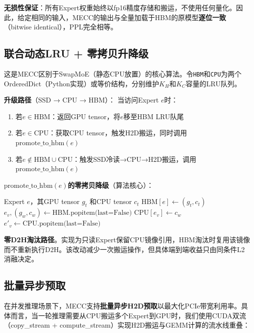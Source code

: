 \documentclass[11pt,a4paper]{article}
\begin{document}
\textbf{无损性保证}：所有Expert权重始终以fp16精度存储和搬运，不使用任何量化。因此，给定相同的输入，MECC的输出与全量加载于HBM的原模型\textbf{逐位一致}（bitwise identical），PPL完全相等。

\subsection{联合动态LRU + 零拷贝升降级}

这是MECC区别于SwapMoE（静态CPU放置）的核心算法。令\texttt{HBM}和\texttt{CPU}为两个OrderedDict（Python实现）或等价结构，分别维护$K_H$和$K_C$容量的LRU队列。

\textbf{升级路径}（SSD → CPU → HBM）：
当访问Expert $e$时：
\begin{enumerate}
    \item 若$e \in \text{HBM}$：返回GPU tensor，将$e$移至HBM LRU队尾
    \item 若$e \in \text{CPU}$：获取CPU tensor，触发H2D搬运，同时调用\textbf{$\text{promote\_to\_hbm}(e)$}
    \item 若$e \notin \text{HBM} \cup \text{CPU}$：触发SSD冷读→CPU→H2D搬运，调用\textbf{$\text{promote\_to\_hbm}(e)$}
\end{enumerate}

\textbf{$\text{promote\_to\_hbm}(e)$的零拷贝降级}（算法核心）：
\begin{algorithm}[!h]
\caption{联合升降级（零拷贝降级）}
\label{alg:promote}
\begin{algorithmic}[1]
\REQUIRE Expert $e$，其GPU tensor $g_t$ 和CPU tensor $c_t$
\STATE $\text{HBM}[e] \leftarrow (g_t, c_t)$  
    \STATE $e_v, (g_w, c_w) \leftarrow \text{HBM.popitem(last=False)}$  
    \STATE $\text{CPU}[e_v] \leftarrow c_w$  
        \STATE $e'_v \leftarrow \text{CPU.popitem(last=False)}$  
    \ENDWHILE
\ENDWHILE
\end{algorithmic}
\end{algorithm}

\textbf{零D2H淘汰路径}。实现为只读Expert保留CPU镜像引用，HBM淘汰时复用该镜像而不重新执行D2H。该改动减少一次搬运操作，但具体端到端收益只由同条件L2消融决定。

\subsection{批量异步预取}

在并发推理场景下，MECC支持\textbf{批量异步H2D预取}以最大化PCIe带宽利用率。具体而言，当一轮推理需要从CPU搬运多个Expert到GPU时，我们使用CUDA双流（copy\_stream + compute\_stream）实现H2D搬运与GEMM计算的流水线重叠：
\end{document}
